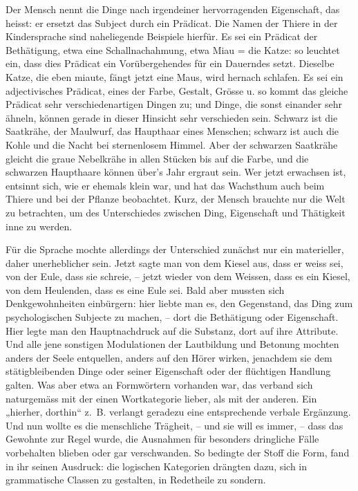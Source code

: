 Der Mensch nennt die Dinge nach irgendeiner hervorragenden Eigenschaft, das heisst: er ersetzt das Subject durch ein Prädicat. Die Namen der Thiere in der Kindersprache sind naheliegende Beispiele hierfür. Es sei ein Prädicat der Bethätigung, etwa eine Schallnachahmung, etwa Miau = die Katze: so leuchtet ein, dass dies Prädicat ein Vorübergehendes für ein Dauerndes setzt. Dieselbe Katze, die eben miaute, fängt jetzt eine Maus, wird hernach schlafen. Es sei \label{sp.382} ein adjectivisches Prädicat, eines der Farbe, Gestalt, Grösse u.  so kommt das gleiche Prädicat sehr verschiedenartigen Dingen zu; und Dinge, die sonst einander sehr ähneln, können gerade in dieser Hinsicht sehr verschieden sein. Schwarz ist die Saatkrähe, der Maulwurf, das Haupthaar eines Menschen; schwarz ist auch die Kohle und die Nacht bei sternenlosem Himmel. Aber der schwarzen Saatkrähe gleicht die graue Nebelkrähe in allen Stücken bis auf die Farbe, und die schwarzen Haupthaare können über’s Jahr ergraut sein. Wer jetzt erwachsen ist, entsinnt sich, wie er ehemals klein war, und hat das Wachsthum auch beim Thiere und bei der Pflanze beobachtet. Kurz, der Mensch brauchte nur die Welt zu betrachten, um des Unterschiedes zwischen Ding, Eigenschaft und Thätigkeit inne zu werden.

Für die Sprache mochte allerdings der Unterschied zunächst nur ein materieller, daher unerheblicher sein. Jetzt sagte man von dem Kiesel aus, dass er weiss sei, von der Eule, dass sie schreie, – jetzt wieder von dem Weissen, dass es ein Kiesel, von dem Heulenden, dass es eine Eule sei. Bald aber mussten sich Denkgewohnheiten einbürgern: hier liebte man es, den Gegenstand, das Ding zum psychologischen Subjecte zu machen, – dort die Bethätigung oder Eigenschaft. Hier legte man den Hauptnachdruck auf die Substanz, dort auf ihre Attribute. Und alle jene sonstigen Modulationen der Lautbildung und Betonung mochten anders der Seele entquellen, anders auf den Hörer wirken, jenachdem sie \label{fp.367} dem stätigbleibenden Dinge oder seiner Eigenschaft oder der flüchtigen Handlung galten. Was aber etwa an Formwörtern vorhanden war, das verband sich naturgemäss mit der einen Wortkategorie lieber, als mit der anderen. Ein „hierher, dorthin“ z.~B. verlangt geradezu eine entsprechende verbale Ergänzung. Und nun wollte es die menschliche Trägheit, – und sie will es immer, – dass das Gewohnte zur Regel wurde, die Ausnahmen für besonders dringliche Fälle vorbehalten blieben oder gar verschwanden. So bedingte der Stoff die Form, fand in ihr seinen Ausdruck: die logischen Kategorien drängten dazu, sich in grammatische Classen zu gestalten, in Redetheile zu sondern.

